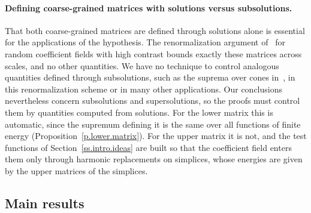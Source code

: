 \documentclass[11pt,letterpaper]{article}
\numberwithin{equation}{section}
\theoremstyle{definition}
\begin{document}
\paragraph{Defining coarse-grained matrices with solutions versus subsolutions.} That both coarse-grained matrices are defined through solutions alone is essential for the applications of the hypothesis. The renormalization argument of~\cite{AK.HC} for random coefficient fields with high contrast bounds exactly these matrices across scales, and no other quantities. We have no technique to control analogous quantities defined through subsolutions, such as the suprema over cones in~\cite{AADKM}, in this renormalization scheme or in many other applications. Our conclusions nevertheless concern subsolutions and supersolutions, so the proofs must control them by quantities computed from solutions. For the lower matrix this is automatic, since the supremum defining it is the same over all functions of finite energy (Proposition~\ref{p.lower.matrix}). For the upper matrix it is not, and the test functions of Section~\ref{ss.intro.ideas} are built so that the coefficient field enters them only through harmonic replacements on simplices, whose energies are given by the upper matrices of the simplices.

\subsection{Main results}
\label{ss.intro.results}
\end{document}
